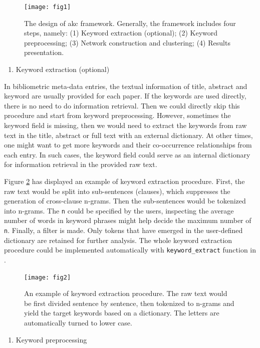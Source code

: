 \begin{figure}
\texttt{[image: fig1]} \caption{The design of akc framework. Generally, the framework includes four steps, namely: (1) Keyword extraction (optional); (2) Keyword preprocessing; (3)   Network construction and clustering; (4)    Results presentation.}\label{fig:fig1}
\end{figure}

\begin{enumerate}
\def\labelenumi{(\arabic{enumi})}
\tightlist
\item
  Keyword extraction (optional)
\end{enumerate}

In bibliometric meta-data entries, the textual information of title, abstract and keyword are usually provided for each paper. If the keywords are used directly, there is no need to do information retrieval. Then we could directly skip this procedure and start from keyword preprocessing. However, sometimes the keyword field is missing, then we would need to extract the keywords from raw text in the title, abstract or full text with an external dictionary. At other times, one might want to get more keywords and their co-occurrence relationships from each entry. In such cases, the keyword field could serve as an internal dictionary for information retrieval in the provided raw text.

Figure \ref{fig:fig2} has displayed an example of keyword extraction procedure. First, the raw text would be split into sub-sentences (clauses), which suppresses the generation of cross-clause n-grams. Then the sub-sentences would be tokenized into n-grams. The \texttt{n} could be specified by the users, inspecting the average number of words in keyword phrases might help decide the maximum number of \texttt{n}. Finally, a filter is made. Only tokens that have emerged in the user-defined dictionary are retained for further analysis. The whole keyword extraction procedure could be implemented automatically with \texttt{keyword\_extract} function in .

\begin{figure}
\texttt{[image: fig2]} \caption{An example of keyword extraction procedure. The raw text would be first divided sentence by sentence, then tokenized to n-grams and yield the target keywords based on a dictionary. The letters are automatically turned to lower case.}\label{fig:fig2}
\end{figure}

\begin{enumerate}
\def\labelenumi{(\arabic{enumi})}
\setcounter{enumi}{1}
\tightlist
\item
  Keyword preprocessing
\end{enumerate}

